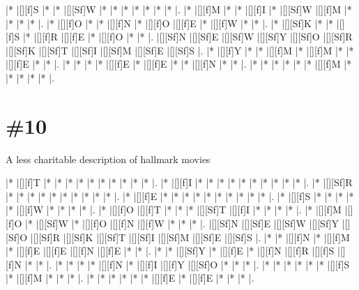 \documentclass[letterpaper]{article}
\begin{document}
\vspace*{1em}
\begin{Puzzle}{12}{8}
|*        |[][f]S   |*        |*        |[][Sf]W  |*        |*        |*        |*        |*        |*        |*        |.
|*        |[][f]M   |*        |*        |[][f]I   |*        |[][Sf]W  |[][f]M   |*        |*        |*        |*        |.
|*        |[][f]O   |*        |*        |[][f]N   |*        |[][f]O   |[][f]E   |*        |[][f]W   |*        |*        |.
|*        |[][Sf]K  |*        |*        |[][f]S   |*        |[][f]R   |[][f]E   |*        |[][f]O   |*        |*        |.
|[][Sf]N  |[][Sf]E  |[][Sf]W  |[][Sf]Y  |[][Sf]O  |[][Sf]R  |[][Sf]K  |[][Sf]T  |[][Sf]I  |[][Sf]M  |[][Sf]E  |[][Sf]S  |.
|*        |[][f]Y   |*        |*        |[][f]M   |*        |[][f]M   |*        |*        |[][f]E   |*        |*        |.
|*        |*        |*        |*        |[][f]E   |*        |[][f]E   |*        |*        |[][f]N   |*        |*        |.
|*        |*        |*        |*        |*        |*        |[][f]M   |*        |*        |*        |*        |*        |.
\end{Puzzle}

\section*{\#10}
A less charitable description of hallmark movies

\vspace*{1em}
\begin{Puzzle}{12}{13}
|*        |[][f]T   |*        |*        |*        |*        |*        |*        |*        |*        |*        |*        |.
|*        |[][f]I   |*        |*        |*        |*        |*        |*        |*        |*        |*        |*        |.
|*        |[][Sf]R  |*        |*        |*        |*        |*        |*        |*        |*        |*        |*        |.
|*        |[][f]E   |*        |*        |*        |*        |*        |*        |*        |*        |*        |*        |.
|*        |[][f]S   |*        |*        |*        |*        |*        |[][f]W   |*        |*        |*        |*        |.
|*        |[][f]O   |[][f]T   |*        |*        |*        |[][Sf]T  |[][f]I   |*        |*        |*        |*        |.
|*        |[][f]M   |[][f]O   |*        |[][Sf]W  |*        |[][f]O   |[][f]N   |[][f]W   |*        |*        |*        |.
|[][Sf]N  |[][Sf]E  |[][Sf]W  |[][Sf]Y  |[][Sf]O  |[][Sf]R  |[][Sf]K  |[][Sf]T  |[][Sf]I  |[][Sf]M  |[][Sf]E  |[][Sf]S  |.
|*        |*        |[][f]N   |*        |[][f]M   |*        |[][f]E   |[][f]E   |[][f]N   |[][f]E   |*        |*        |.
|*        |*        |[][Sf]Y  |*        |[][f]E   |*        |[][f]N   |[][f]R   |[][f]S   |[][f]N   |*        |*        |.
|*        |*        |*        |*        |[][f]N   |*        |[][f]I   |[][f]Y   |[][Sf]O  |*        |*        |*        |.
|*        |*        |*        |*        |*        |*        |[][f]S   |*        |[][f]M   |*        |*        |*        |.
|*        |*        |*        |*        |*        |*        |[][f]E   |*        |[][f]E   |*        |*        |*        |.
\end{Puzzle}
\end{document}
